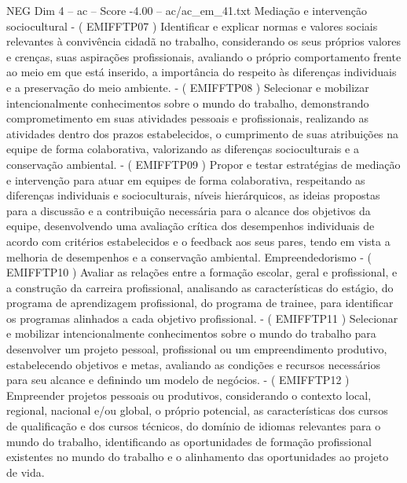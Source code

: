 \begin{textsample}{NEG Dim 4 – ac – Score -4.00 – ac/ac\_em\_41.txt}
Mediação e intervenção sociocultural - ( EMIFFTP07 ) Identificar e explicar normas e valores sociais relevantes à convivência cidadã no trabalho, considerando os seus próprios valores e crenças, suas aspirações profissionais, avaliando o próprio comportamento frente ao meio em que está inserido, a importância do respeito às diferenças individuais e a preservação do meio ambiente. - ( EMIFFTP08 ) Selecionar e mobilizar intencionalmente conhecimentos sobre o mundo do trabalho, demonstrando comprometimento em suas atividades pessoais e profissionais, realizando as atividades dentro dos prazos estabelecidos, o cumprimento de suas atribuições na equipe de forma colaborativa, valorizando as diferenças socioculturais e a conservação ambiental. - ( EMIFFTP09 ) Propor e testar estratégias de mediação e intervenção para atuar em equipes de forma colaborativa, respeitando as diferenças individuais e socioculturais, níveis hierárquicos, as ideias propostas para a discussão e a contribuição necessária para o alcance dos objetivos da equipe, desenvolvendo uma avaliação crítica dos desempenhos individuais de acordo com critérios estabelecidos e o feedback aos seus pares, tendo em vista a melhoria de desempenhos e a conservação ambiental.
Empreendedorismo - ( EMIFFTP10 ) Avaliar as relações entre a formação escolar, geral e profissional, e a construção da carreira profissional, analisando as características do estágio, do programa de aprendizagem profissional, do programa de trainee, para identificar os programas alinhados a cada objetivo profissional. - ( EMIFFTP11 ) Selecionar e mobilizar intencionalmente conhecimentos sobre o mundo do trabalho para desenvolver um projeto pessoal, profissional ou um empreendimento produtivo, estabelecendo objetivos e metas, avaliando as condições e recursos necessários para seu alcance e definindo um modelo de negócios. - ( EMIFFTP12 ) Empreender projetos pessoais ou produtivos, considerando o contexto local, regional, nacional e/ou global, o próprio potencial, as características dos cursos de qualificação e dos cursos técnicos, do domínio de idiomas relevantes para o mundo do trabalho, identificando as oportunidades de formação profissional existentes no mundo do trabalho e o alinhamento das oportunidades ao projeto de vida.

\end{textsample}
